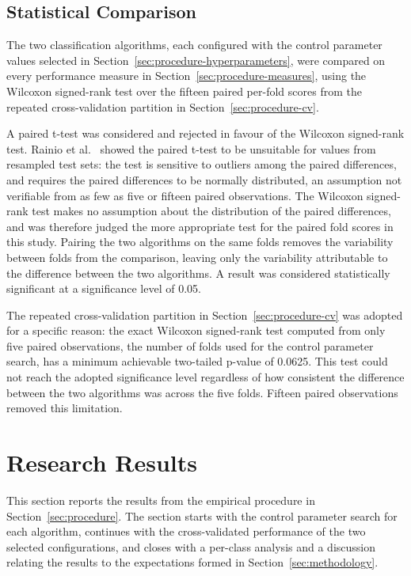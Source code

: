 \documentclass[10pt,conference]{IEEEtran}
\begin{document}
\subsection{Statistical Comparison}
\label{sec:procedure-comparison}

The two classification algorithms, each configured with the control parameter values selected in Section~\ref{sec:procedure-hyperparameters}, were compared on every performance measure in Section~\ref{sec:procedure-measures}, using the Wilcoxon signed-rank test over the fifteen paired per-fold scores from the repeated cross-validation partition in Section~\ref{sec:procedure-cv}.

A paired t-test was considered and rejected in favour of the Wilcoxon signed-rank test. Rainio et al.~\cite{rainio2024} showed the paired t-test to be unsuitable for values from resampled test sets: the test is sensitive to outliers among the paired differences, and requires the paired differences to be normally distributed, an assumption not verifiable from as few as five or fifteen paired observations. The Wilcoxon signed-rank test makes no assumption about the distribution of the paired differences, and was therefore judged the more appropriate test for the paired fold scores in this study. Pairing the two algorithms on the same folds removes the variability between folds from the comparison, leaving only the variability attributable to the difference between the two algorithms. A result was considered statistically significant at a significance level of 0.05.

The repeated cross-validation partition in Section~\ref{sec:procedure-cv} was adopted for a specific reason: the exact Wilcoxon signed-rank test computed from only five paired observations, the number of folds used for the control parameter search, has a minimum achievable two-tailed p-value of 0.0625. This test could not reach the adopted significance level regardless of how consistent the difference between the two algorithms was across the five folds. Fifteen paired observations removed this limitation.

\section{Research Results}
\label{sec:results}

This section reports the results from the empirical procedure in Section~\ref{sec:procedure}. The section starts with the control parameter search for each algorithm, continues with the cross-validated performance of the two selected configurations, and closes with a per-class analysis and a discussion relating the results to the expectations formed in Section~\ref{sec:methodology}.
\end{document}
